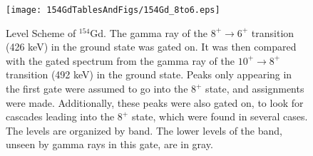 \begin{figure}[!]
    \centering
    \texttt{[image: 154GdTablesAndFigs/154Gd\_8to6.eps]}
    \caption{Level Scheme of $^{154}$Gd. The gamma ray of the $8^+\rightarrow6^+$ transition (426 keV) in the ground state was gated on. It was then compared with the gated spectrum from the gamma ray of the $10^+\rightarrow8^+$ transition (492 keV) in the ground state. Peaks only appearing in the first gate were assumed to go into the $8^+$ state, and assignments were made. Additionally, these peaks were also gated on, to look for cascades leading into the $8^+$ state, which were found in several cases. The levels are organized by band. The lower levels of the band, unseen by gamma rays in this gate, are in gray.}
    \label{fig:154_8to6}
\end{figure}